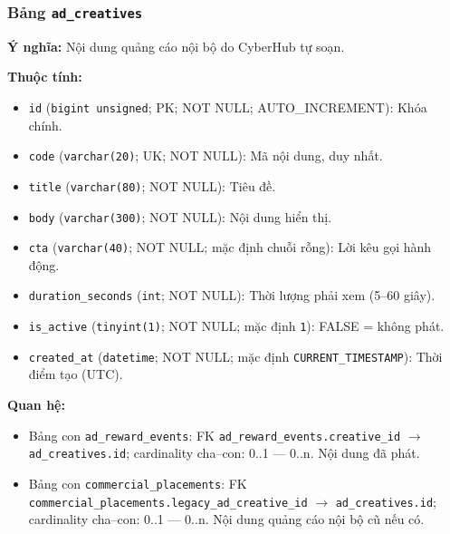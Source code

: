 \subsubsection{Bảng \texttt{ad\_creatives}}

\textbf{Ý nghĩa:} Nội dung quảng cáo nội bộ do CyberHub tự soạn.\par

\textbf{Thuộc tính:}

\begin{itemize}

\item \texttt{id} (\texttt{bigint unsigned}; PK; NOT NULL; AUTO_INCREMENT): Khóa chính.

\item \texttt{code} (\texttt{varchar(20)}; UK; NOT NULL): Mã nội dung, duy nhất.

\item \texttt{title} (\texttt{varchar(80)}; NOT NULL): Tiêu đề.

\item \texttt{body} (\texttt{varchar(300)}; NOT NULL): Nội dung hiển thị.

\item \texttt{cta} (\texttt{varchar(40)}; NOT NULL; mặc định chuỗi rỗng): Lời kêu gọi hành động.

\item \texttt{duration\_seconds} (\texttt{int}; NOT NULL): Thời lượng phải xem (5–60 giây).

\item \texttt{is\_active} (\texttt{tinyint(1)}; NOT NULL; mặc định \texttt{1}): FALSE = không phát.

\item \texttt{created\_at} (\texttt{datetime}; NOT NULL; mặc định \texttt{CURRENT\_TIMESTAMP}): Thời điểm tạo (UTC).

\end{itemize}

\textbf{Quan hệ:}

\begin{itemize}

\item Bảng con \texttt{ad\_reward\_events}: FK \texttt{ad\_reward\_events.creative\_id} $\rightarrow$ \texttt{ad\_creatives.id}; cardinality cha--con: 0..1 — 0..n. Nội dung đã phát.

\item Bảng con \texttt{commercial\_placements}: FK \texttt{commercial\_placements.legacy\_ad\_creative\_id} $\rightarrow$ \texttt{ad\_creatives.id}; cardinality cha--con: 0..1 — 0..n. Nội dung quảng cáo nội bộ cũ nếu có.

\end{itemize}

